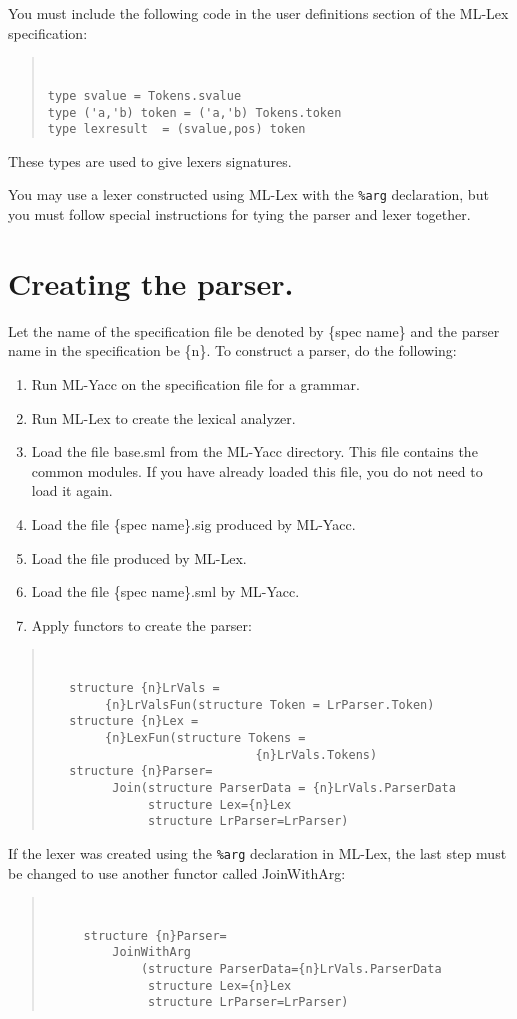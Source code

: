 You must include the following code in the user definitions section of
the ML-Lex specification:
\begin{quote}
\tt
\begin{verbatim}
type svalue = Tokens.svalue
type ('a,'b) token = ('a,'b) Tokens.token
type lexresult  = (svalue,pos) token
\end{verbatim}
\end{quote}

These types are used to give lexers signatures.

You may use a lexer constructed using ML-Lex with the {\tt \%arg}
declaration, but you must follow special instructions for tying the parser
and lexer together.
 
\section{Creating the parser.}
\label{create-parser}
Let the name of the specification file be denoted by \{spec name\} and
the parser name in the specification be \{n\}.
To construct a parser, do the following:

\begin{enumerate}

\item Run ML-Yacc on the specification file for a grammar.
\item Run ML-Lex to create the lexical analyzer.
\item Load the file base.sml from the ML-Yacc directory.  This file contains
the common modules.  If you have already loaded this file, you do not need
to load it again.
\item Load the file \{spec name\}.sig produced by ML-Yacc.
\item Load the file produced by ML-Lex.
\item Load the file \{spec name\}.sml by ML-Yacc.
\item Apply functors to create the parser:

\end{enumerate}
\begin{quote}
\tt
\begin{verbatim}
   structure {n}LrVals =
        {n}LrValsFun(structure Token = LrParser.Token)
   structure {n}Lex = 
        {n}LexFun(structure Tokens = 
                             {n}LrVals.Tokens)
   structure {n}Parser=
         Join(structure ParserData = {n}LrVals.ParserData
              structure Lex={n}Lex
              structure LrParser=LrParser)
\end{verbatim}
\end{quote}
If the lexer was created using the {\tt \%arg} declaration in ML-Lex,
the last step
must be changed to use another functor called JoinWithArg:
\begin{quote}
\tt
\begin{verbatim}
     structure {n}Parser=
         JoinWithArg
             (structure ParserData={n}LrVals.ParserData
              structure Lex={n}Lex
              structure LrParser=LrParser)
\end{verbatim}
\end{quote}

